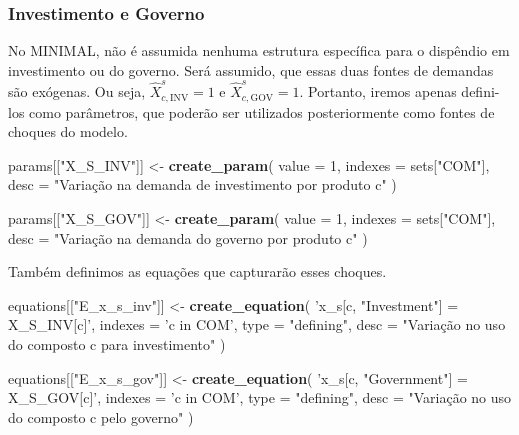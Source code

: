 \documentclass[12pt,twoside]{article}
\newenvironment{Shaded}{\begin{snugshade}}{\end{snugshade}}
\newcommand{\DataTypeTok}[1]{\textcolor[rgb]{0.13,0.29,0.53}{#1}}
\newcommand{\DecValTok}[1]{\textcolor[rgb]{0.00,0.00,0.81}{#1}}
\newcommand{\KeywordTok}[1]{\textcolor[rgb]{0.13,0.29,0.53}{\textbf{#1}}}
\newcommand{\NormalTok}[1]{#1}
\newcommand{\StringTok}[1]{\textcolor[rgb]{0.31,0.60,0.02}{#1}}
\let\oldShaded\Shaded
\let\endoldShaded\endShaded
\renewenvironment{Shaded}{\footnotesize\oldShaded}{\endoldShaded}
\begin{document}
\hypertarget{investimento-e-governo}{%
\subsubsection{Investimento e Governo}\label{investimento-e-governo}}

No MINIMAL, não é assumida nenhuma estrutura específica para o dispêndio
em investimento ou do governo. Será assumido, que essas duas fontes de
demandas são exógenas. Ou seja, \(\hat{X}^s_{c,\text{INV}} = 1\) e
\(\hat{X}^s_{c,\text{GOV}} = 1\). Portanto, iremos apenas defini-los
como parâmetros, que poderão ser utilizados posteriormente como fontes
de choques do modelo.

\begin{Shaded}
\begin{Highlighting}[]
\NormalTok{params[[}\StringTok{"X_S_INV"}\NormalTok{]] <-}\StringTok{ }\KeywordTok{create_param}\NormalTok{(}
  \DataTypeTok{value =} \DecValTok{1}\NormalTok{,}
  \DataTypeTok{indexes =}\NormalTok{ sets[}\StringTok{"COM"}\NormalTok{],}
  \DataTypeTok{desc =} \StringTok{"Variação na demanda de investimento por produto c"}
\NormalTok{)}

\NormalTok{params[[}\StringTok{"X_S_GOV"}\NormalTok{]] <-}\StringTok{ }\KeywordTok{create_param}\NormalTok{(}
  \DataTypeTok{value =} \DecValTok{1}\NormalTok{,}
  \DataTypeTok{indexes =}\NormalTok{ sets[}\StringTok{"COM"}\NormalTok{],}
  \DataTypeTok{desc =} \StringTok{"Variação na demanda do governo por produto c"}
\NormalTok{)}
\end{Highlighting}
\end{Shaded}

Também definimos as equações que capturarão esses choques.

\begin{Shaded}
\begin{Highlighting}[]
\NormalTok{equations[[}\StringTok{"E_x_s_inv"}\NormalTok{]] <-}\StringTok{ }\KeywordTok{create_equation}\NormalTok{(}
  \StringTok{'x_s[c, "Investment"] = X_S_INV[c]'}\NormalTok{,}
  \DataTypeTok{indexes =} \StringTok{'c in COM'}\NormalTok{,}
  \DataTypeTok{type =} \StringTok{"defining"}\NormalTok{,}
  \DataTypeTok{desc =} \StringTok{"Variação no uso do composto c para investimento"}
\NormalTok{)}

\NormalTok{equations[[}\StringTok{"E_x_s_gov"}\NormalTok{]] <-}\StringTok{ }\KeywordTok{create_equation}\NormalTok{(}
  \StringTok{'x_s[c, "Government"] = X_S_GOV[c]'}\NormalTok{,}
  \DataTypeTok{indexes =} \StringTok{'c in COM'}\NormalTok{,}
  \DataTypeTok{type =} \StringTok{"defining"}\NormalTok{,}
  \DataTypeTok{desc =} \StringTok{"Variação no uso do composto c pelo governo"}
\NormalTok{)}
\end{Highlighting}
\end{Shaded}
\end{document}
